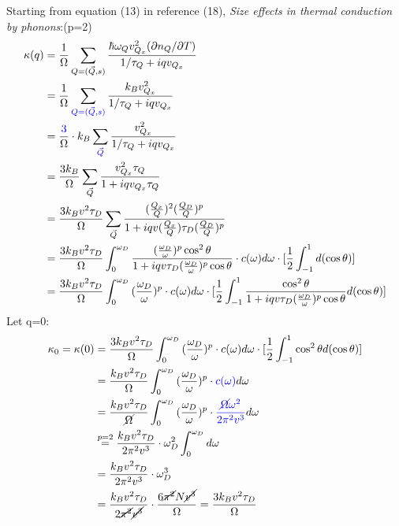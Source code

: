 \documentclass{article}
\author{}
\begin{document}
Starting from equation (13) in reference (18), \textit{Size effects in thermal conduction by phonons}:(p=2)
\begin{equation*}
\begin{split}
\kappa(q)&=\frac{1}{\Omega}\sum\limits_{Q=(\vec{Q},s)}\frac{\hbar\omega_Q v^2_{Q_x}(\partial n_Q/\partial T)}{1/\tau_Q+iqv_{Q_x}}\\
&=\frac{1}{\Omega}\sum\limits_{\color{blue}Q=(\vec{Q},s)}\frac{k_B v^2_{Q_x}}{1/\tau_Q+iqv_{Q_x}}\\
&=\frac{{\color{blue}3}}{\Omega}\cdot k_B \sum\limits_{\color{blue}\vec{Q}}\frac{v^2_{Q_x}}{1/\tau_Q+iqv_{Q_x}}\\
&=\frac{3 k_B}{\Omega} \sum\limits_{\vec{Q}}\frac{v^2_{Q_x} \tau_Q}{1+iqv_{Q_x}\tau_Q}\\
&=\frac{3 k_B v^2 \tau_D}{\Omega} \sum\limits_{\vec{Q}}\frac{(\frac{Q_x}{Q})^2 (\frac{Q_D}{Q})^p}{1+iqv(\frac{Q_x}{Q})\tau_D(\frac{Q_D}{Q})^p}\\
&=\frac{3 k_B v^2 \tau_D}{\Omega} \int_{0}^{\omega_D}\frac{ (\frac{\omega_D}{\omega})^p\cos^2\theta}{1+iqv\tau_D(\frac{\omega_D}{\omega})^p\cos\theta}\cdot c(\omega)d\omega \cdot [\frac{1}{2}\int_{-1}^{1}d(\cos\theta)]\\
&=\frac{3 k_B v^2 \tau_D}{\Omega} \int_{0}^{\omega_D}{(\frac{\omega_D}{\omega})^p}\cdot c(\omega)d\omega \cdot [\frac{1}{2}\int_{-1}^{1}\frac{\cos^2\theta}{1+iqv\tau_D(\frac{\omega_D}{\omega})^p\cos\theta}d(\cos\theta)]\\
\end{split}
\end{equation*}
Let q=0:
\begin{equation*}
\begin{split}
\kappa_0=\kappa(0)&=\frac{3 k_B v^2 \tau_D}{\Omega} \int_{0}^{\omega_D}{(\frac{\omega_D}{\omega})^p}\cdot c(\omega)d\omega \cdot [\frac{1}{2}\int_{-1}^{1}\cos^2\theta d(\cos\theta)]\\
&=\frac{k_B v^2 \tau_D}{\Omega} \int_{0}^{\omega_D}{(\frac{\omega_D}{\omega})^p}\cdot {\color{blue}c(\omega)}d\omega\\
&=\frac{k_B v^2 \tau_D}{\cancel{\Omega}} \int_{0}^{\omega_D}{(\frac{\omega_D}{\omega})^p}\cdot {\color{blue}\frac{\cancel{\Omega}\omega^2}{2\pi^2v^3}}d\omega\\
&\stackrel{p=2}{=}\frac{k_B v^2 \tau_D}{2\pi^2v^3} \cdot\omega_D^2\int_{0}^{\omega_D}d\omega\\
&=\frac{k_B v^2 \tau_D}{2\pi^2v^3} \cdot\omega_D^3\\
&=\frac{k_B v^2 \tau_D}{2\cancel{\pi^2}\cancel{v^3}}\cdot\frac{6\cancel{\pi^2} N\cancel{v^3}}{\Omega}=\frac{3k_B v^2 \tau_D}{\Omega}\\
\end{split}
\end{equation*}
\end{document}
